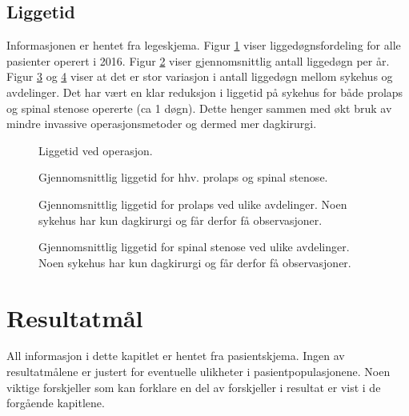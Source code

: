 \documentclass [norsk,a4paper,twoside]{article}\usepackage[]{graphicx}\usepackage[]{color}
\begin{document}
\clearpage

\subsection{Liggetid}

Informasjonen er hentet fra legeskjema.
Figur \ref{fig:Liggedogn} viser liggedøgnsfordeling for alle pasienter operert i 2016. Figur \ref{fig:LiggedognTid} viser gjennomsnittlig antall liggedøgn per år.  
Figur \ref{fig:LiggetidAvdPro} og \ref{fig:LiggetidAvdSS} viser at det er stor variasjon i antall liggedøgn mellom sykehus og avdelinger.
Det har vært en klar reduksjon i  liggetid på sykehus  for både prolaps og spinal stenose opererte (ca 1 døgn). Dette henger sammen med økt bruk av mindre invassive operasjonsmetoder og dermed mer dagkirurgi. 





\begin{figure}[h] 
\caption{Liggetid ved operasjon.}
\label{fig:Liggedogn}
\end{figure}

\begin{figure}[h] 
\centerline{
}
\caption{Gjennomsnittlig liggetid for hhv. prolaps og spinal stenose. }
\label{fig:LiggedognTid}
\end{figure}

\begin{figure}[h] 
\caption{Gjennomsnittlig liggetid for prolaps ved ulike avdelinger. Noen sykehus har kun dagkirurgi og får derfor få observasjoner. } 
\label{fig:LiggetidAvdPro}
\end{figure}

\begin{figure}[h] 
\caption{Gjennomsnittlig liggetid for spinal stenose ved ulike avdelinger. Noen sykehus har kun dagkirurgi og får derfor få observasjoner. } 
\label{fig:LiggetidAvdSS}
\end{figure}






\clearpage

\section{Resultatmål}
All informasjon i dette kapitlet er hentet fra pasientskjema. Ingen av resultatmålene er justert
for eventuelle ulikheter i pasientpopulasjonene. Noen viktige forskjeller som kan forklare en del av forskjeller i resultat er vist i de forgående kapitlene.
\end{document}
